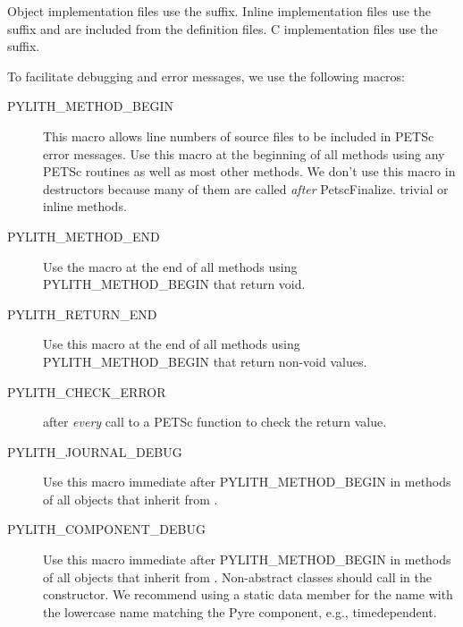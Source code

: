 Object implementation files use the  suffix. Inline
implementation files use the  suffix and are included
from the definition files. C implementation files use the 
suffix.

To facilitate debugging and error messages, we use the following
macros:
\begin{description}
\item[PYLITH\_METHOD\_BEGIN] This macro allows line numbers of source
  files to be included in PETSc error messages. Use this macro at the
  beginning of all methods using any PETSc routines as well as most
  other methods. We don't use this macro in destructors because many
  of them are called {\em after} PetscFinalize.  trivial or inline
  methods.
\item[PYLITH\_METHOD\_END] Use the macro at the end of all methods
  using PYLITH\_METHOD\_BEGIN that return void.
\item[PYLITH\_RETURN\_END] Use this macro at the end of all methods
  using PYLITH\_METHOD\_BEGIN that return non-void values.
\item[PYLITH\_CHECK\_ERROR] after {\em every} call to a PETSc function
  to check the return value.
\item[PYLITH\_JOURNAL\_DEBUG] Use this macro immediate after
  PYLITH\_METHOD\_BEGIN in methods of all objects that inherit from .
\item[PYLITH\_COMPONENT\_DEBUG] Use this macro immediate after
  PYLITH\_METHOD\_BEGIN in methods of all objects that inherit from
  .  Non-abstract classes should call
   in the constructor. We recommend
  using a static data member for the name with the lowercase name
  matching the Pyre component, e.g., timedependent.
\end{description}

